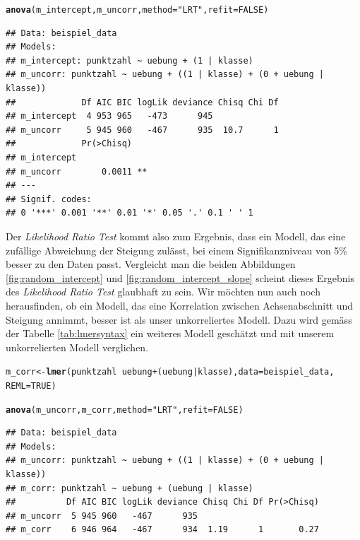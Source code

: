 \documentclass[12pt]{article}\usepackage[]{graphicx}\usepackage[]{color}
\makeatletter
\newcommand{\hlnum}[1]{\textcolor[rgb]{0.686,0.059,0.569}{#1}}%
\newcommand{\hlstr}[1]{\textcolor[rgb]{0.192,0.494,0.8}{#1}}%
\newcommand{\hlopt}[1]{\textcolor[rgb]{0,0,0}{#1}}%
\newcommand{\hlstd}[1]{\textcolor[rgb]{0.345,0.345,0.345}{#1}}%
\newcommand{\hlkwb}[1]{\textcolor[rgb]{0.69,0.353,0.396}{#1}}%
\newcommand{\hlkwc}[1]{\textcolor[rgb]{0.333,0.667,0.333}{#1}}%
\newcommand{\hlkwd}[1]{\textcolor[rgb]{0.737,0.353,0.396}{\textbf{#1}}}%
\newenvironment{kframe}{%
 \def\at@end@of@kframe{}%
 \ifinner\ifhmode%
  \def\at@end@of@kframe{\end{minipage}}%
  \begin{minipage}{\columnwidth}%
 \fi\fi%
 \def\FrameCommand##1{\hskip\@totalleftmargin \hskip-\fboxsep
 \colorbox{shadecolor}{##1}\hskip-\fboxsep
     \hskip-\linewidth \hskip-\@totalleftmargin \hskip\columnwidth}%
 \MakeFramed {\advance\hsize-\width
   \@totalleftmargin\z@ \linewidth\hsize
   \@setminipage}}%
 {\par\unskip\endMakeFramed%
 \at@end@of@kframe}
\newenvironment{knitrout}{}{} %
\makeatother
\begin{document}
\singlespacing
\begin{knitrout}
\color{fgcolor}\begin{kframe}
\begin{alltt}
\hlkwd{anova}\hlstd{(m_intercept, m_uncorr,} \hlkwc{method} \hlstd{=} \hlstr{"LRT"}\hlstd{,} \hlkwc{refit} \hlstd{=} \hlnum{FALSE}\hlstd{)}
\end{alltt}
\begin{verbatim}
## Data: beispiel_data
## Models:
## m_intercept: punktzahl ~ uebung + (1 | klasse)
## m_uncorr: punktzahl ~ uebung + ((1 | klasse) + (0 + uebung | klasse))
##             Df AIC BIC logLik deviance Chisq Chi Df
## m_intercept  4 953 965   -473      945             
## m_uncorr     5 945 960   -467      935  10.7      1
##             Pr(>Chisq)   
## m_intercept              
## m_uncorr        0.0011 **
## ---
## Signif. codes:  
## 0 '***' 0.001 '**' 0.01 '*' 0.05 '.' 0.1 ' ' 1
\end{verbatim}
\end{kframe}
\end{knitrout}

Der \textit{Likelihood Ratio Test} kommt also zum Ergebnis, dass ein Modell, das eine zufällige Abweichung der Steigung zulässt, bei einem Signifikanzniveau von 5\% besser zu den Daten passt. Vergleicht man die beiden Abbildungen \ref{fig:random_intercept} und \ref{fig:random_intercept_slope} scheint dieses Ergebnis des \textit{Likelihood Ratio Test} glaubhaft zu sein. Wir möchten nun auch noch herausfinden, ob ein Modell, das eine Korrelation zwischen Achsenabschnitt und Steigung annimmt, besser ist als unser unkorreliertes Modell. Dazu wird gemäss der Tabelle \ref{tab:lmersyntax} ein weiteres Modell geschätzt und mit unserem unkorrelierten Modell verglichen.

\singlespacing
\begin{knitrout}
\color{fgcolor}\begin{kframe}
\begin{alltt}
\hlstd{m_corr} \hlkwb{<-} \hlkwd{lmer}\hlstd{(punktzahl} \hlopt{~} \hlstd{uebung} \hlopt{+} \hlstd{(uebung} \hlopt{|} \hlstd{klasse),} \hlkwc{data} \hlstd{= beispiel_data,}
    \hlkwc{REML} \hlstd{=} \hlnum{TRUE}\hlstd{)}

\hlkwd{anova}\hlstd{(m_uncorr, m_corr,} \hlkwc{method} \hlstd{=} \hlstr{"LRT"}\hlstd{,} \hlkwc{refit} \hlstd{=} \hlnum{FALSE}\hlstd{)}
\end{alltt}
\begin{verbatim}
## Data: beispiel_data
## Models:
## m_uncorr: punktzahl ~ uebung + ((1 | klasse) + (0 + uebung | klasse))
## m_corr: punktzahl ~ uebung + (uebung | klasse)
##          Df AIC BIC logLik deviance Chisq Chi Df Pr(>Chisq)
## m_uncorr  5 945 960   -467      935                        
## m_corr    6 946 964   -467      934  1.19      1       0.27
\end{verbatim}
\end{kframe}
\end{knitrout}
\end{document}
